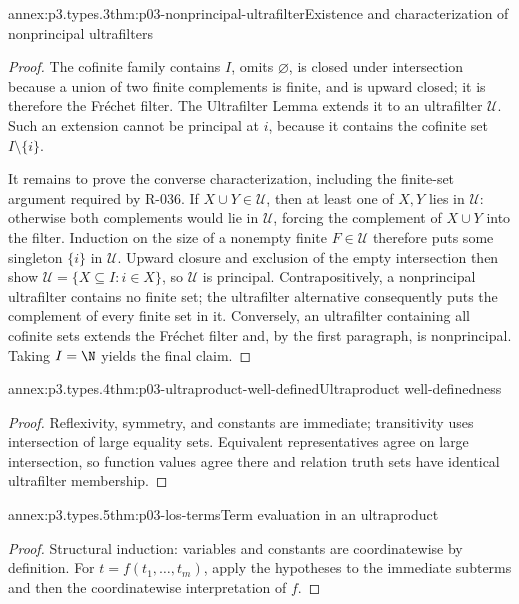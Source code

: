\begin{annexitem}{annex:p3.types.3}{thm:p03-nonprincipal-ultrafilter}{Existence and characterization of nonprincipal ultrafilters}
\begin{proof}
The cofinite family contains \(I\), omits \(\varnothing\), is closed under
intersection because a union of two finite complements is finite, and is
upward closed; it is therefore the Fr\'echet filter.  The Ultrafilter Lemma
extends it to an ultrafilter \(\mathcal U\).  Such an extension cannot be
principal at \(i\), because it contains the cofinite set
\(I\setminus\{i\}\).

It remains to prove the converse characterization, including the finite-set
argument required by R-036.  If \(X\cup Y\in\mathcal U\), then at least one
of \(X,Y\) lies in \(\mathcal U\): otherwise both complements would lie in
\(\mathcal U\), forcing the complement of \(X\cup Y\) into the filter.
Induction on the size of a nonempty finite \(F\in\mathcal U\) therefore puts
some singleton \(\{i\}\) in \(\mathcal U\).  Upward closure and exclusion
of the empty intersection then show
\(\mathcal U=\{X\subseteq I:i\in X\}\), so \(\mathcal U\) is principal.
Contrapositively, a nonprincipal ultrafilter contains no finite set; the
ultrafilter alternative consequently puts the complement of every finite set
in it.  Conversely, an ultrafilter containing all cofinite sets extends the
Fr\'echet filter and, by the first paragraph, is nonprincipal.  Taking
\(I=\N\) yields the final claim.
\end{proof}
\end{annexitem}

\begin{annexitem}{annex:p3.types.4}{thm:p03-ultraproduct-well-defined}{Ultraproduct well-definedness}
\begin{proof}
Reflexivity, symmetry, and constants are immediate;
transitivity uses intersection of large equality sets.  Equivalent
representatives agree on large intersection, so function values agree there
and relation truth sets have identical ultrafilter membership.
\end{proof}
\end{annexitem}

\begin{annexitem}{annex:p3.types.5}{thm:p03-los-terms}{Term evaluation in an ultraproduct}
\begin{proof}
Structural induction: variables and constants are coordinatewise by
definition.  For \(t=f(t_1,\ldots,t_m)\), apply the hypotheses to the immediate
subterms and then the coordinatewise interpretation of \(f\).
\end{proof}
\end{annexitem}

